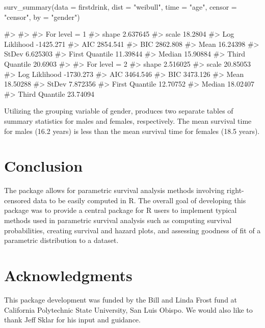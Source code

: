 \begin{Schunk}
\begin{Sinput}
surv_summary(data = firstdrink, dist = "weibull", time = "age", censor = "censor", by = "gender")
\end{Sinput}
\begin{Soutput}
#> 
#> 
#> For level = 1 
#> shape        2.637645
#> scale        18.2804
#> Log Liklihood    -1425.271
#> AIC      2854.541
#> BIC      2862.808
#> Mean     16.24398
#> StDev        6.625303
#> First Quantile   11.39844
#> Median       15.90884
#> Third Quantile   20.6903
#> 
#> For level = 2 
#> shape        2.516025
#> scale        20.85053
#> Log Liklihood    -1730.273
#> AIC      3464.546
#> BIC      3473.126
#> Mean     18.50288
#> StDev        7.872356
#> First Quantile   12.70752
#> Median       18.02407
#> Third Quantile   23.74094
\end{Soutput}
\end{Schunk}

Utilizing the grouping variable of gender, produces two separate tables
of summary statistics for males and females, respectively. The mean
survival time for males (16.2 years) is less than the mean survival time
for females (18.5 years).

\hypertarget{conclusion}{%
\section{Conclusion}\label{conclusion}}

The  package allows for parametric survival analysis
methods involving right-censored data to be easily computed in R. The
overall goal of developing this package was to provide a central package
for R users to implement typical methods used in parametric survival
analysis such as computing survival probabilities, creating survival and
hazard plots, and assessing goodness of fit of a parametric distribution
to a dataset.

\hypertarget{acknowledgments}{%
\section{Acknowledgments}\label{acknowledgments}}

This package development was funded by the Bill and Linda Frost fund at
California Polytechnic State University, San Luis Obispo. We would also
like to thank Jeff Sklar for his input and guidance.




